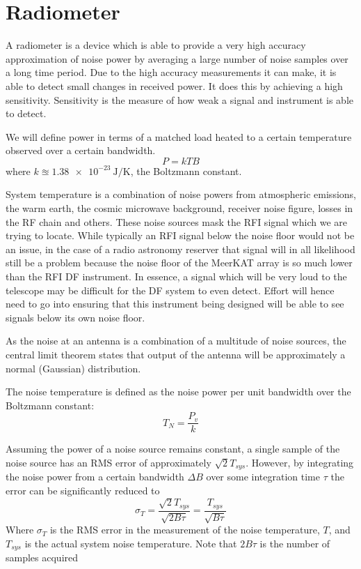 \section{Radiometer}
A radiometer is a device which is able to provide a very high accuracy approximation of noise power by averaging a large number of noise samples over a long time period. Due to the high accuracy measurements it can make, it is able to detect small changes in received power. 
It does this by achieving a high sensitivity. Sensitivity is the measure of how weak a signal and instrument is able to detect.

We will define power in terms of a matched load heated to a certain temperature observed over a certain bandwidth.
\begin{equation}
  P = kTB
\end{equation}
where \(k \approxeq \SI{1.38e-23}{\joule\per\kelvin}\), the Boltzmann constant. 

System temperature is a combination of noise powers from atmospheric emissions, the warm earth, the cosmic microwave background, receiver noise figure, losses in the RF chain and others. These noise sources mask the RFI signal which we are trying to locate. While typically an RFI signal below the noise floor would not be an issue, in the case of a radio astronomy reserver that signal will in all likelihood still be a problem because the noise floor of the MeerKAT array is so much lower than the RFI DF instrument. In essence, a signal which will be very loud to the telescope may be difficult for the DF system to even detect. Effort will hence need to go into ensuring that this instrument being designed will be able to see signals below its own noise floor. 

As the noise at an antenna is a combination of a multitude of noise sources, the central limit theorem states that output of the antenna will be approximately a normal (Gaussian) distribution. 

The noise temperature is defined as the noise power per unit bandwidth over the Boltzmann constant:
\begin{equation}
  T_N = \frac{P_v}{k}
\end{equation}

Assuming the power of a noise source remains constant, a single sample of the noise source has an RMS error of approximately \(\sqrt{2}T_{sys}\). However, by integrating the noise power from a certain bandwidth \(\Delta B\) over some integration time \(\tau\) the error can be significantly reduced to
\begin{equation}
  \sigma_{T} = \frac{\sqrt{2}T_{sys}}{\sqrt{2B\tau}} = \frac{T_{sys}}{\sqrt{B \tau}}
\end{equation}
Where \(\sigma_{T}\) is the RMS error in the measurement of the noise temperature, \(T\), and \(T_{sys}\) is the actual system noise temperature. Note that \(2B\tau\) is the number of samples acquired

